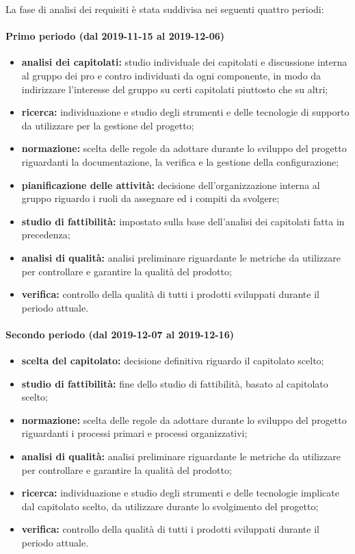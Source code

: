 			La fase di analisi dei requisiti è stata suddivisa nei seguenti quattro periodi:
			
			\paragraph{Primo periodo (dal 2019-11-15 al 2019-12-06)}
			
				\begin{itemize}
					\item \textbf{analisi dei capitolati:} studio individuale dei capitolati e discussione interna al gruppo dei pro e contro individuati da ogni componente, in modo da indirizzare l'interesse del gruppo su certi capitolati piuttosto che su altri;
					\item \textbf{ricerca:} individuazione e studio degli strumenti e delle tecnologie di supporto da utilizzare per la gestione del progetto;
					\item \textbf{normazione:} scelta delle regole da adottare durante lo sviluppo del progetto riguardanti la documentazione, la verifica e la gestione della configurazione;
					\item \textbf{pianificazione delle attività:} decisione dell'organizzazione interna al gruppo riguardo i ruoli da assegnare ed i compiti da svolgere;
					\item \textbf{studio di fattibilità:} impostato sulla base dell'analisi dei capitolati fatta in precedenza;
					\item \textbf{analisi di qualità:} analisi preliminare riguardante le metriche da utilizzare per controllare e garantire la qualità del prodotto;
					\item \textbf{verifica:} controllo della qualità di tutti i prodotti sviluppati durante il periodo attuale.
				\end{itemize}
			
			\paragraph{Secondo periodo (dal 2019-12-07 al 2019-12-16)}
			
				\begin{itemize}
					\item \textbf{scelta del capitolato:} decisione definitiva riguardo il capitolato scelto;
					\item \textbf{studio di fattibilità:} fine dello studio di fattibilità, basato al capitolato scelto;
					\item \textbf{normazione:} scelta delle regole da adottare durante lo sviluppo del progetto riguardanti i processi primari e processi organizzativi;
					\item \textbf{analisi di qualità:} analisi preliminare riguardante le metriche da utilizzare per controllare e garantire la qualità del prodotto;
					\item \textbf{ricerca:} individuazione e studio degli strumenti e delle tecnologie implicate dal capitolato scelto, da utilizzare durante lo svolgimento del progetto;
					\item \textbf{verifica:} controllo della qualità di tutti i prodotti sviluppati durante il periodo attuale.
				\end{itemize}
			
